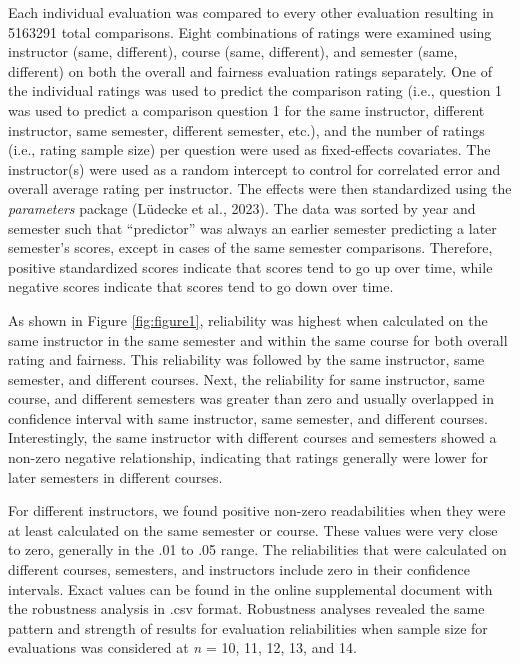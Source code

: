 \documentclass[
  man]{apa7}
\begin{document}
Each individual evaluation was compared to every other evaluation
resulting in 5163291 total comparisons. Eight combinations of
ratings were examined using instructor (same, different), course (same,
different), and semester (same, different) on both the overall and
fairness evaluation ratings separately. One of the individual ratings
was used to predict the comparison rating (i.e., question 1 was used to
predict a comparison question 1 for the same instructor, different
instructor, same semester, different semester, etc.), and the number of
ratings (i.e., rating sample size) per question were used as
fixed-effects covariates. The instructor(s) were used as a random
intercept to control for correlated error and overall average rating per
instructor. The effects were then standardized using the \emph{parameters}
package (Lüdecke et al., 2023). The data was sorted by year and semester such
that ``predictor'' was always an earlier semester predicting a later
semester's scores, except in cases of the same semester comparisons.
Therefore, positive standardized scores indicate that scores tend to go
up over time, while negative scores indicate that scores tend to go down
over time.

As shown in Figure \ref{fig:figure1}, reliability was highest when
calculated on the same instructor in the same semester and within the
same course for both overall rating and fairness. This reliability was
followed by the same instructor, same semester, and different courses.
Next, the reliability for same instructor, same course, and different
semesters was greater than zero and usually overlapped in confidence
interval with same instructor, same semester, and different courses.
Interestingly, the same instructor with different courses and semesters
showed a non-zero negative relationship, indicating that ratings
generally were lower for later semesters in different courses.

For different instructors, we found positive non-zero readabilities when
they were at least calculated on the same semester or course. These
values were very close to zero, generally in the .01 to .05 range. The
reliabilities that were calculated on different courses, semesters, and
instructors include zero in their confidence intervals. Exact values can
be found in the online supplemental document with the robustness
analysis in .csv format. Robustness analyses revealed the same pattern
and strength of results for evaluation reliabilities when sample size
for evaluations was considered at \emph{n} = 10, 11, 12, 13, and 14.
\end{document}
